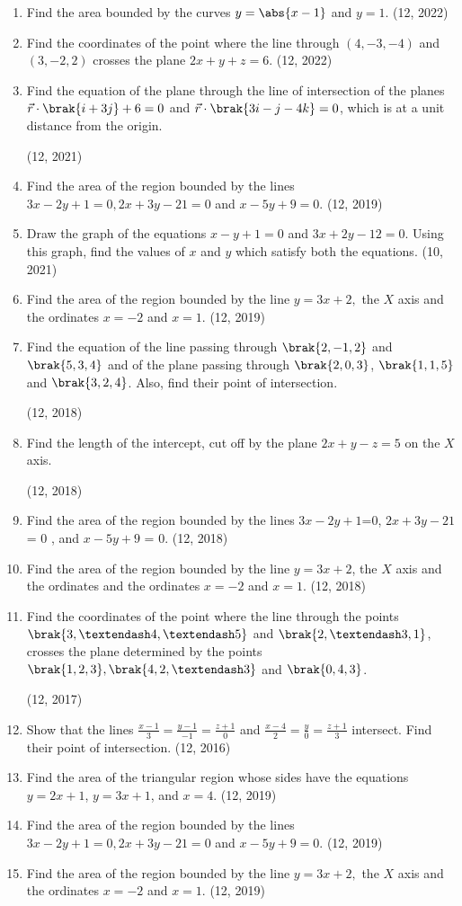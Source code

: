 \begin{enumerate}[label=\thesubsection.\arabic*, ref=\thesubsection.\theenumi]
\item Find the area bounded by the curves $y=\abs{x-1}$ and $y=1$. \hfill (12, 2022)

\item Find the coordinates of the point where the line through $(4,-3,-4)$ and $(3,-2,2)$ crosses the plane $2x+y+z=6$. \hfill (12, 2022)
\item Find the equation of the plane through the line of intersection of the planes 
  $\vec{r} \cdot \brak{i+3j} + 6 = 0 $
  and
  $\vec{r} \cdot \brak{3i - j - 4k} = 0$,
which is at a unit distance from the origin.

\hfill (12, 2021)
\item Find the area of the region bounded by the lines $3x - 2y + 1 = 0, 2x + 3y - 21 = 0$ and $x - 5y + 9 = 0$. \hfill (12, 2019)
\item Draw the graph of the equations $x - y + 1 = 0$ and $3x + 2y - 12 = 0$. Using this graph, find the values of $x$ and $y$ which satisfy both the equations.
\hfill (10, 2021)

\item Find the area of the region bounded by the line $y = 3x + 2,$ the $X$ axis and the ordinates $x = - 2$ and $x = 1$. \hfill (12, 2019)
\item Find the equation of the line passing through $\brak{2,-1, 2}$ and $\brak{5, 3, 4}$ and of the plane passing through $\brak{2, 0, 3}$, $\brak{1, 1, 5}$ and $\brak{3, 2, 4}$. Also, find their point of intersection.

	\hfill (12, 2018)
\item Find the length of the intercept, cut off by the plane $2x+y-z=5$ on the $X$ axis.

	\hfill (12, 2018)
\item Find the area of the region bounded by the lines $3x-2y+1$=$0$, $2x+3y-21$ = $0$ , and  $x-5y+9$ = $0$. \hfill (12, 2018)
\item Find the area of the region bounded by the line $y = 3x + 2$, the $X$ axis and the ordinates and the ordinates $x=-2$ and $x=1$. \hfill (12, 2018)
\item Find the coordinates of the point where the line through the points $\brak{3, – 4, – 5}$ and $\brak{2, – 3, 1}$, crosses the plane determined by the points $\brak{1, 2, 3}, \brak{4, 2, – 3}$ and $\brak{0, 4, 3}$.

	\hfill (12, 2017)
\item Show that the lines $\frac{x-1}{3} = \frac{y-1}{-1} = \frac{z+1}{0} $ and $\frac{x-4}{2} = \frac{y}{0} = \frac{z+1}{3} $ intersect. Find their point of intersection. \hfill (12, 2016)
	\item Find the area of the triangular region whose sides have the equations $y = 2x + 1$, $y = 3x + 1$, and $x = 4$. \hfill (12, 2019)
\item Find the area of the region bounded by the lines $3x - 2y + 1 = 0, 2x + 3y - 21 = 0$ and $x - 5y + 9 = 0$.
\hfill (12, 2019)
\item Find the area of the region bounded by the line
$y = 3x + 2,$ the $X$ axis and the ordinates $x = - 2$ and $x = 1$.
\hfill (12, 2019)
\end{enumerate}
